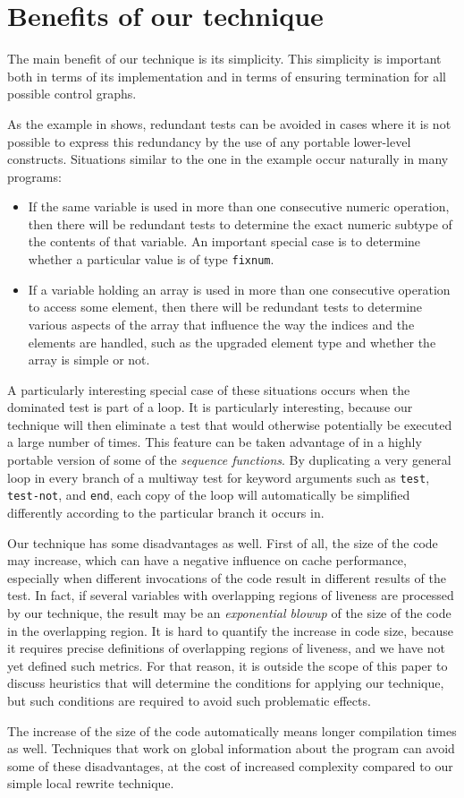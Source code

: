 \section{Benefits of our technique}

The main benefit of our technique is its simplicity.  This simplicity
is important both in terms of its implementation and in terms of
ensuring termination for all possible control graphs.

As the example in  shows, redundant
tests can be avoided in cases where it is not possible to express this
redundancy by the use of any portable lower-level constructs.
Situations similar to the one in the example occur naturally in many
programs:

\begin{itemize}
\item If the same variable is used in more than one consecutive
  numeric operation, then there will be redundant tests to determine
  the exact numeric subtype of the contents of that variable.  An
  important special case is to determine whether a particular value is
  of type \texttt{fixnum}.
\item If a variable holding an array is used in more than one
  consecutive operation to access some element, then there will be
  redundant tests to determine various aspects of the array that
  influence the way the indices and the elements are handled, such as
  the upgraded element type and whether the array is simple or not.
\end{itemize}

A particularly interesting special case of these situations occurs
when the dominated test is part of a loop.  It is particularly
interesting, because our technique will then eliminate a test that
would otherwise potentially be executed a large number of times.  This
feature can be taken advantage of in a highly portable version of some
of the \commonlisp{} \emph{sequence functions}.  By duplicating a very
general loop in every branch of a multiway test for keyword arguments
such as \texttt{test}, \texttt{test-not}, and \texttt{end}, each copy
of the loop will automatically be simplified differently according to
the particular branch it occurs in.

Our technique has some disadvantages as well.  First of all, the size
of the code may increase, which can have a negative influence on cache
performance, especially when different invocations of the code result
in different results of the test.  In fact, if several variables with
overlapping regions of liveness are processed by our technique, the
result may be an \emph{exponential blowup} of the size of the code in
the overlapping region.  It is hard to quantify the increase in code
size, because it requires precise definitions of overlapping regions
of liveness, and we have not yet defined such metrics.  For that
reason, it is outside the scope of this paper to discuss heuristics
that will determine the conditions for applying our technique, but
such conditions are required to avoid such problematic effects.

The increase of the size of the code automatically means longer
compilation times as well.  Techniques that work on global information
about the program can avoid some of these disadvantages, at the cost
of increased complexity compared to our simple local rewrite
technique.
